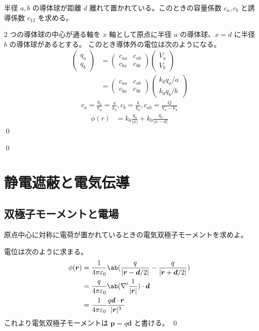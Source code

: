 \documentclass[uplatex,dvipdfmx,a4paper,11pt]{jlreq}
\makeatletter
\newcommand{\rr}{\bm{r}}
\newcommand{\pp}{\bm{p}}
\newcommand{\vnabla}{\mathbf{\nabla}}
\newcommand\mqty[1]{\begin{pmatrix}#1\end{pmatrix}}
\numberwithin{equation}{section}
\theoremstyle{definition}
\renewenvironment{proof}[1][\proofname]{\par
  \normalfont
  \topsep6\p@\@plus6\p@ \trivlist
  \item[\hskip\labelsep{\bfseries #1}\@addpunct{\bfseries}]\ignorespaces\quad\par
}{%
  \qed\endtrivlist\@endpefalse
}
\renewcommand\proofname{証明}
\makeatother
\begin{document}
\begin{problem}
半径 $a, b$ の導体球が距離 $d$ 離れて置かれている。このときの容量係数 $c_a, c_b$ と誘導係数 $c_{12}$ を求める。
\end{problem}
\begin{proof}
  2 つの導体球の中心が通る軸を $x$ 軸として原点に半径 $a$ の導体球、$x = d$ に半径 $b$ の導体球があるとする。
  このとき導体外の電位は次のようになる。
  \begin{align}
    \mqty{q_a                  \\ q_b} & = \mqty{c_{aa} & c_{ab} \\ c_{ba} & c_{bb}}\mqty{V_a \\ V_b} \\
     & = \mqty{c_{aa} & c_{ab} \\ c_{ba} & c_{bb}}\mqty{k_0q_a/a \\ k_0q_b/b}
  \end{align}
  \begin{align}
    c_a = \frac{q_a}{V_a} = \frac{a}{k_0}, c_b = \frac{b}{k_0}, c_{ab} = \frac{Q}{V_a - V_b}
  \end{align}
  \begin{align}
    \phi(r) & = k_0\frac{q_a}{|x|} + k_0\frac{q_b}{|x - d|}
  \end{align}
\end{proof}

\begin{problem}
\end{problem}
\begin{proof}
\end{proof}

\section{静電遮蔽と電気伝導}
\subsection{双極子モーメントと電場}
\begin{problem}
原点中心に対称に電荷が置かれているときの電気双極子モーメントを求めよ。
\end{problem}
\begin{proof}
  電位は次のように求まる。
  \begin{align}
    \phi(\rr) & = \frac{1}{4\pi\varepsilon_0}\ab(\frac{q}{|\rr - \bm{d}/2|} - \frac{q}{|\rr + \bm{d}/2|}) \\
              & = \frac{q}{4\pi\varepsilon_0}\ab(\vnabla'\frac{1}{|\rr|})\cdot\bm{d}                      \\
              & = \frac{1}{4\pi\varepsilon_0}\frac{q\bm{d}\cdot\rr}{|\rr|^3}
  \end{align}
  これより電気双極子モーメントは $\pp = q\bm{d}$ と書ける。
\end{proof}
\end{document}
